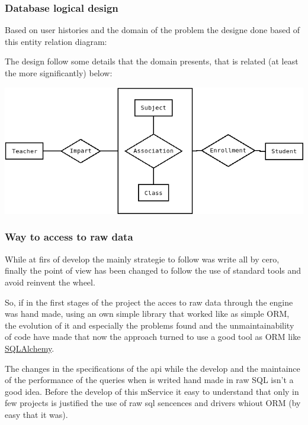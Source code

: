 \subsubsection{Database logical design}

Based on user histories and the domain of the problem the designe
done based of this entity relation diagram:

The design follow some details that the domain presents, that is related
(at least the more significantly) below:

\begin{center}
\includegraphics[scale=0.4]{img/diagrams/dbms-ER.png}
\end{center}



\subsubsection{Way to access to raw data}

While at firs of develop the mainly strategie to follow was write
all by cero, finally the point of view has been changed to follow
the use of standard tools and avoid reinvent the wheel.

So, if in the first stages of the project the acces to raw data through
the engine was hand made, using an own simple library that worked
like as simple ORM, the evolution of it and especially the problems
found and the unmaintainability of code have made that now the approach
turned to use a good tool as ORM like \href{http://www.google.es}{SQLAlchemy}.

The changes in the specifications of the api while the develop and
the maintaince of the performance of the queries when is writed hand
made in raw SQL isn't a good idea. Before the develop of this mService
it easy to understand that only in few projects is justified the use
of raw sql sencences and drivers whiout ORM (by easy that it was).


